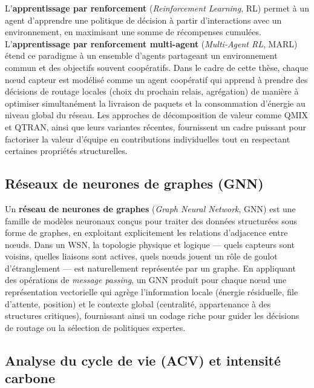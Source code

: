 L'\textbf{apprentissage par renforcement} (\emph{Reinforcement Learning}, RL) permet à un agent d'apprendre une politique de décision à partir d'interactions avec un environnement, en maximisant une somme de récompenses cumulées\cite{mnih2015dqn}. L'\textbf{apprentissage par renforcement multi-agent} (\emph{Multi-Agent RL}, MARL) étend ce paradigme à un ensemble d'agents partageant un environnement commun et des objectifs souvent coopératifs\cite{noauthor_multi-agent_nodate}. Dans le cadre de cette thèse, chaque nœud capteur est modélisé comme un agent coopératif qui apprend à prendre des décisions de routage locales (choix du prochain relais, agrégation) de manière à optimiser simultanément la livraison de paquets et la consommation d'énergie au niveau global du réseau\cite{rashid2018qmix,son2019qtran,Hayes2022MOMARL}. Les approches de décomposition de valeur comme QMIX et QTRAN, ainsi que leurs variantes récentes, fournissent un cadre puissant pour factoriser la valeur d'équipe en contributions individuelles tout en respectant certaines propriétés structurelles\cite{rashid2018qmix,son2019qtran,Wang2021QPLEX}.

\subsection*{Réseaux de neurones de graphes (GNN)}

Un \textbf{réseau de neurones de graphes} (\emph{Graph Neural Network}, GNN) est une famille de modèles neuronaux conçus pour traiter des données structurées sous forme de graphes, en exploitant explicitement les relations d'adjacence entre nœuds\cite{gilmer2017mpnn,kipf2017semi,velickovic2018gat}. Dans un WSN, la topologie physique et logique — quels capteurs sont voisins, quelles liaisons sont actives, quels nœuds jouent un rôle de goulot d'étranglement — est naturellement représentée par un graphe\cite{al_qundus_wireless_2020,erdelj2017disaster}. En appliquant des opérations de \emph{message passing}, un GNN produit pour chaque nœud une représentation vectorielle qui agrège l'information locale (énergie résiduelle, file d'attente, position) et le contexte global (centralité, appartenance à des structures critiques), fournissant ainsi un codage riche pour guider les décisions de routage ou la sélection de politiques expertes\cite{liu2024gnncomm,Nguyen2025GNNIoT}.

\subsection*{Analyse du cycle de vie (ACV) et intensité carbone}

